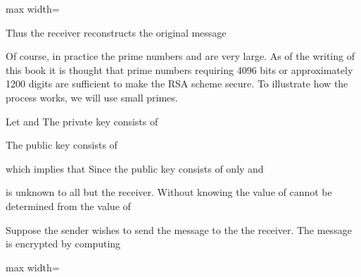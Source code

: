 \documentclass[11pt,oneside]{article}
\begin{document}
\begin{BookBody}
\begin{center}\begin{adjustbox}{max width=\linewidth}\end{adjustbox}\end{center}

\noindent Thus the receiver reconstructs the original message 

Of course, in practice the prime numbers  and  are very large. As of the writing of this book it is thought that prime numbers requiring 4096 bits or approximately 1200 digits are sufficient to make the RSA scheme secure. To illustrate how the process works, we will use small primes.

 Let  and  The private key consists of




\noindent The public key consists of



which implies that  Since the public key consists of only  and 

 is unknown to all but the receiver. Without knowing  the value of  cannot be determined from the value of 

Suppose the sender wishes to send the message  to the the receiver. The message is encrypted by computing

\begin{center}\begin{adjustbox}{max width=\linewidth}\end{adjustbox}\end{center}

\end{BookBody}
\end{document}
